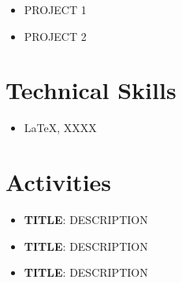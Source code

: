 \documentclass{template}
\begin{document}
   \begin{itemize}
   \item PROJECT 1
   \item PROJECT 2

   \end{itemize}


\section*{Technical Skills}
\begin{itemize}
\item {\textrm{\LaTeX}, XXXX} %
\end{itemize}
    
\section*{Activities}

\begin{itemize}
    \item \textbf{TITLE}: {DESCRIPTION}
    \item \textbf{TITLE}: {DESCRIPTION}
    \item \textbf{TITLE}: {DESCRIPTION}
    \end{itemize}
\end{document}
